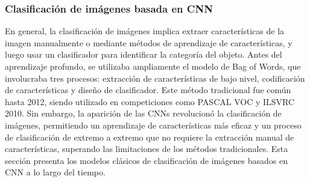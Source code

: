 \subsubsection{Clasificación de imágenes basada en CNN}
En general, la clasificación de imágenes implica extraer características de la imagen manualmente o mediante métodos de aprendizaje de características, y luego usar un clasificador para identificar la categoría del objeto. Antes del aprendizaje profundo, se utilizaba ampliamente el modelo de Bag of Words, que involucraba tres procesos: extracción de características de bajo nivel, codificación de características y diseño de clasificador. Este método tradicional fue común hasta 2012, siendo utilizado en competiciones como PASCAL VOC y ILSVRC 2010. Sin embargo, la aparición de las CNNs revolucionó la clasificación de imágenes, permitiendo un aprendizaje de características más eficaz y un proceso de clasificación de extremo a extremo que no requiere la extracción manual de características, superando las limitaciones de los métodos tradicionales. Esta sección presenta los modelos clásicos de clasificación de imágenes basados en CNN a lo largo del tiempo.




